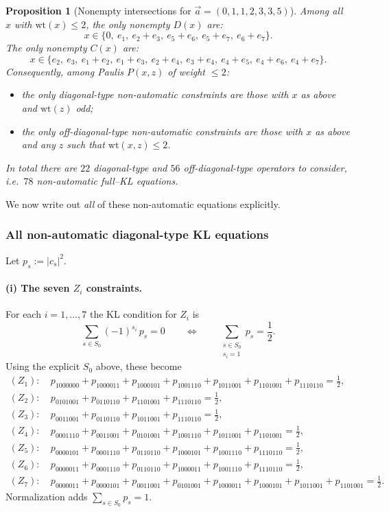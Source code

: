 \documentclass[11pt]{article}
\newtheorem{proposition}{Proposition}
\newcommand{\wt}{\mathrm{wt}}
\begin{document}
\begin{proposition}[Nonempty intersections for $\vec a=(0,1,1,2,3,3,5)$]
\label{prop:nonempty-intersections-a0112335}
Among all $x$ with $\wt(x)\le 2$, the only nonempty $D(x)$ are:
\[
x\in\{0,\ e_1,\ e_2+e_3,\ e_5+e_6,\ e_5+e_7,\ e_6+e_7\}.
\]
The only nonempty $C(x)$ are:
\[
x\in\{e_2,\ e_3,\ e_1+e_2,\ e_1+e_3,\ e_2+e_4,\ e_3+e_4,\ e_4+e_5,\ e_4+e_6,\ e_4+e_7\}.
\]
Consequently, among Paulis $P(x,z)$ of weight $\le 2$:
\begin{itemize}
\item the only \emph{diagonal-type} non-automatic constraints are those with $x$ as above and $\wt(z)$ odd;
\item the only \emph{off-diagonal-type} non-automatic constraints are those with $x$ as above and any $z$ such that $\wt(x,z)\le 2$.
\end{itemize}
In total there are $22$ diagonal-type and $56$ off-diagonal-type operators to consider, i.e.\ $78$ non-automatic full--KL equations.
\end{proposition}

We now write out \emph{all} of these non-automatic equations explicitly.

\subsubsection*{All non-automatic diagonal-type KL equations}
Let $p_s:=|c_s|^2$.

\paragraph{(i) The seven $Z_i$ constraints.}
For each $i=1,\dots,7$ the KL condition for $Z_i$ is
\begin{equation}
\sum_{s\in S_0} (-1)^{s_i}\,p_s =0
\qquad\Longleftrightarrow\qquad
\sum_{\substack{s\in S_0\\ s_i=1}} p_s=\frac12.
\label{eq:Zi-abstract}
\end{equation}
Using the explicit $S_0$ above, these become
\begin{align}
(Z_1):\ &p_{1000000}+p_{1000011}+p_{1000101}+p_{1001110}+p_{1011001}+p_{1101001}+p_{1110110}=\tfrac12,\nonumber\\
(Z_2):\ &p_{0101001}+p_{0110110}+p_{1101001}+p_{1110110}=\tfrac12,\nonumber\\
(Z_3):\ &p_{0011001}+p_{0110110}+p_{1011001}+p_{1110110}=\tfrac12,\nonumber\\
(Z_4):\ &p_{0001110}+p_{0011001}+p_{0101001}+p_{1001110}+p_{1011001}+p_{1101001}=\tfrac12,\nonumber\\
(Z_5):\ &p_{0000101}+p_{0001110}+p_{0110110}+p_{1000101}+p_{1001110}+p_{1110110}=\tfrac12,\nonumber\\
(Z_6):\ &p_{0000011}+p_{0001110}+p_{0110110}+p_{1000011}+p_{1001110}+p_{1110110}=\tfrac12,\nonumber\\
(Z_7):\ &p_{0000011}+p_{0000101}+p_{0011001}+p_{0101001}+p_{1000011}+p_{1000101}+p_{1011001}+p_{1101001}=\tfrac12.
\label{eq:Zi-explicit}
\end{align}
Normalization adds $\sum_{s\in S_0} p_s=1$.
\end{document}

